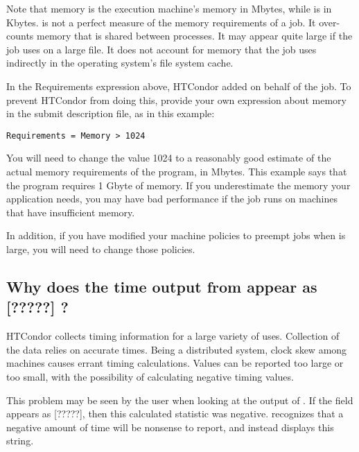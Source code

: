 Note that memory is the execution machine's memory in Mbytes,
while  is in Kbytes.
 is not a perfect measure of the memory requirements of a job.
It over-counts memory that is shared between processes.
It may appear quite large if the job uses  on a large file.
It does not account for memory that the job uses indirectly in the operating
system's file system cache.

In the Requirements expression above, 
HTCondor added  on behalf of the job.
To prevent HTCondor from doing this,
provide your own expression about memory in the submit description file,
as in this example:

\begin{verbatim}
Requirements = Memory > 1024
\end{verbatim}

You will need to change the value 1024 to a reasonably good estimate of 
the actual
memory requirements of the program, in Mbytes. This example says that
the program requires 1 Gbyte of memory. If you underestimate the
memory your application needs, you may have bad performance if the job
runs on machines that have insufficient memory.

In addition, if you have modified your machine policies to preempt
jobs when  is large,
you will need to change those policies.

\subsection*{Why does the time output from  appear
as [?????] ? }

HTCondor collects timing information for a large variety of uses.
Collection of the data relies on accurate times.
Being a distributed system, clock skew among machines causes 
errant timing calculations.
Values can be reported too large or too small, with the possibility
of calculating negative timing values.

This problem may be seen by the user when looking at the output
of .
If the  field appears
as [?????],
then this calculated statistic was negative.
 recognizes that a negative amount of time will
be nonsense to report, and instead displays this string. 

